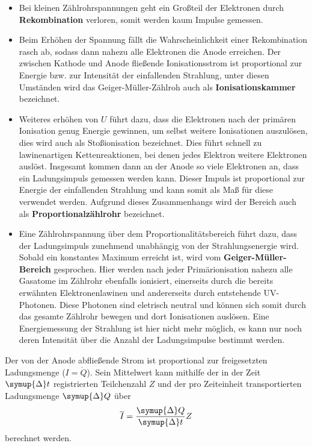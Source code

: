 \begin{itemize}
\item Bei kleinen Zählrohrspannungen geht ein Großteil der Elektronen durch \textbf{Rekombination} verloren, somit
werden kaum Impulse gemessen.
\item Beim Erhöhen der Spannung fällt die Wahrscheinlichkeit einer Rekombination rasch ab,
sodass dann nahezu alle Elektronen die Anode erreichen. Der zwischen Kathode und Anode fließende
Ionisationsstrom ist proportional zur Energie bzw. zur Intensität der einfallenden Strahlung, unter diesen Umständen
wird das Geiger-Müller-Zählroh auch als \textbf{Ionisationskammer} bezeichnet.
\item Weiteres erhöhen von $U$ führt dazu, dass die Elektronen nach der primären Ionisation genug Energie gewinnen,
um selbst weitere Ionisationen auszulösen, dies wird auch als Stoßionisation bezeichnet. Dies führt schnell zu
lawinenartigen Kettenreaktionen, bei denen jedes Elektron weitere Elektronen auslöst. Insgesamt kommen dann
an der Anode so viele Elektronen an, dass ein Ladungsimpuls gemessen werden kann. Dieser Impuls ist proportional
zur Energie der einfallenden Strahlung und kann somit als Maß für diese verwendet werden. Aufgrund dieses Zusammenhangs
wird der Bereich auch als \textbf{Proportionalzählrohr} bezeichnet.
\item Eine Zählrohrspannung über dem Proportionalitätsbereich führt dazu, dass der Ladungsimpuls zunehmend unabhängig von der
Strahlungsenergie wird. Sobald ein konstantes Maximum erreicht ist, wird vom \textbf{Geiger-Müller-Bereich} gesprochen.
Hier werden nach jeder Primärionisation nahezu alle Gasatome im Zählrohr ebenfalls ionisiert, einerseits durch die bereits erwähnten
Elektronenlawinen und andererseits durch entstehende UV-Photonen. Diese Photonen sind eletrisch neutral und können sich somit durch das
gesamte Zählrohr bewegen und dort Ionisationen auslösen.
Eine Energiemessung der Strahlung ist hier nicht mehr möglich, es kann nur noch deren Intensität über die
Anzahl der Ladungsimpulse bestimmt werden.
\end{itemize}
Der von der Anode abfließende Strom ist proportional zur freigesetzten Ladungsmenge ($I = \dot{Q}$).
Sein Mittelwert kann mithilfe der in der Zeit $\symup{\Delta}t$ registrierten Teilchenzahl $Z$ und der pro Zeiteinheit
transportierten Ladungsmenge $\symup{\Delta}Q$ über 
\begin{equation}
  \label{eq:strom}
  \overline{I} = \frac{\symup{\Delta}Q}{\symup{\Delta}t}Z
\end{equation} 
berechnet werden.

